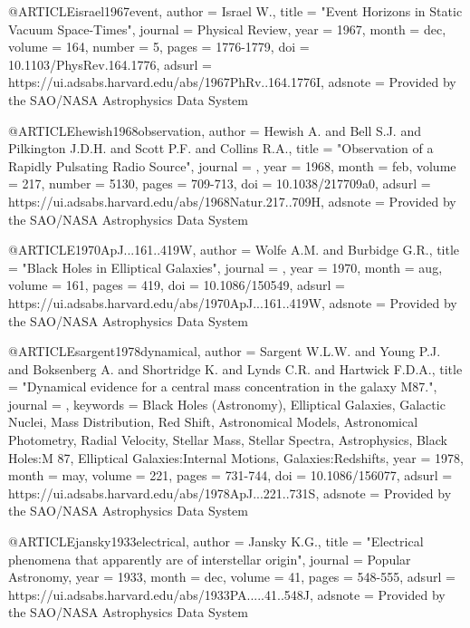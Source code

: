 @ARTICLE{israel1967event,
       author = {{Israel W.}},
        title = "{Event Horizons in Static Vacuum Space-Times}",
      journal = {Physical Review},
         year = 1967,
        month = dec,
       volume = {164},
       number = {5},
        pages = {1776-1779},
          doi = {10.1103/PhysRev.164.1776},
       adsurl = {https://ui.adsabs.harvard.edu/abs/1967PhRv..164.1776I},
      adsnote = {Provided by the SAO/NASA Astrophysics Data System}
}

@ARTICLE{hewish1968observation,
       author = {{Hewish A.} and {Bell S.J.} and {Pilkington J.D.H.} and
         {Scott P.F.} and {Collins R.A.}},
        title = "{Observation of a Rapidly Pulsating Radio Source}",
      journal = {\nat},
         year = 1968,
        month = feb,
       volume = {217},
       number = {5130},
        pages = {709-713},
          doi = {10.1038/217709a0},
       adsurl = {https://ui.adsabs.harvard.edu/abs/1968Natur.217..709H},
      adsnote = {Provided by the SAO/NASA Astrophysics Data System}
}

@ARTICLE{1970ApJ...161..419W,
       author = {{Wolfe A.M.} and {Burbidge G.R.}},
        title = "{Black Holes in Elliptical Galaxies}",
      journal = {\apj},
         year = 1970,
        month = aug,
       volume = {161},
        pages = {419},
          doi = {10.1086/150549},
       adsurl = {https://ui.adsabs.harvard.edu/abs/1970ApJ...161..419W},
      adsnote = {Provided by the SAO/NASA Astrophysics Data System}
}

@ARTICLE{sargent1978dynamical,
       author = {{Sargent W.L.W.} and {Young P.J.} and {Boksenberg A.} and
         {Shortridge K.} and {Lynds C.R.} and {Hartwick F.D.A.}},
        title = "{Dynamical evidence for a central mass concentration in the galaxy M87.}",
      journal = {\apj},
     keywords = {Black Holes (Astronomy), Elliptical Galaxies, Galactic Nuclei, Mass Distribution, Red Shift, Astronomical Models, Astronomical Photometry, Radial Velocity, Stellar Mass, Stellar Spectra, Astrophysics, Black Holes:M 87, Elliptical Galaxies:Internal Motions, Galaxies:Redshifts},
         year = 1978,
        month = may,
       volume = {221},
        pages = {731-744},
          doi = {10.1086/156077},
       adsurl = {https://ui.adsabs.harvard.edu/abs/1978ApJ...221..731S},
      adsnote = {Provided by the SAO/NASA Astrophysics Data System}
}

@ARTICLE{jansky1933electrical,
       author = {{Jansky K.G.}},
        title = "{Electrical phenomena that apparently are of interstellar origin}",
      journal = {Popular Astronomy},
         year = 1933,
        month = dec,
       volume = {41},
        pages = {548-555},
       adsurl = {https://ui.adsabs.harvard.edu/abs/1933PA.....41..548J},
      adsnote = {Provided by the SAO/NASA Astrophysics Data System}
}

